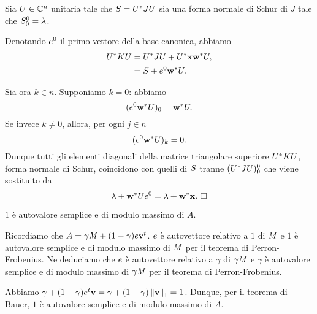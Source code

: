 \Proof Sia $U \in \mathbb{C}^n$ unitaria tale che
$S = {U}^* J U$
sia una forma normale di Schur di $J$ tale che
$S_0^0 = \lambda$.
\par Denotando $e^0$ il primo vettore della base canonica, abbiamo
\begin{align}
  \HermitianTransposed{\UnitaryMatrix} K \UnitaryMatrix
  &= \HermitianTransposed{\UnitaryMatrix} J \UnitaryMatrix
    + \HermitianTransposed{\UnitaryMatrix}
      \Eigenvector\HermitianTransposed{\VarVector}
      \UnitaryMatrix,\\
  &= \SchurNormalForm
    + \CanonicalBase^0\HermitianTransposed{\VarVector}
      \UnitaryMatrix.
\end{align}
\par Sia ora $k \in n$. Supponiamo $k = 0$: abbiamo
\[
  (e^0{\mathbf{w}}^*U)_0
  = {\mathbf{w}}^*U.
\]
Se invece $k \neq 0$, allora, per ogni $j \in n$
\[
  (e^0{\mathbf{w}}^*U)_k
  = 0.
\]
Dunque tutti gli elementi diagonali della matrice triangolare superiore
${U}^* K U$,
forma normale di Schur,
coincidono con quelli di $S$ tranne
$({U}^* J U)_0^0$
che viene sostituito da
\[
  \Eigenvalue + \HermitianTransposed{\VarVector}\UnitaryMatrix\CanonicalBase^0
  = \Eigenvalue + \HermitianTransposed{\VarVector}\Eigenvector.
  \text{ \EndProof}
\]
\begin{Theorem}
  $1$ \`e autovalore semplice e di modulo massimo di $A$.
\end{Theorem}
\Proof Ricordiamo che
$A = \gamma\mathit{M} + (1 - \gamma)e{\mathbf{v}}^t$.
$e$ \`e autovettore relativo a $1$ di $\mathit{M}$ e $1$ \`e autovalore
semplice e di modulo massimo di $\mathit{M}$ per il teorema di Perron-Frobenius.
Ne deduciamo che
$e$ \`e autovettore relativo a $\gamma$ di $\gamma\mathit{M}$ e
$\gamma$ \`e autovalore semplice e di modulo massimo di $\gamma\mathit{M}$
per il teorema di Perron-Frobenius.
\par Abbiamo
$\gamma + (1 - \gamma)\Transposed{\AllOnes}\Vector
= \gamma + (1 - \gamma)\Norm{\Vector}[1] = 1$.
Dunque, per il teorema di Bauer, $1$ \`e autovalore semplice e di modulo
massimo di $A$. \EndProof
